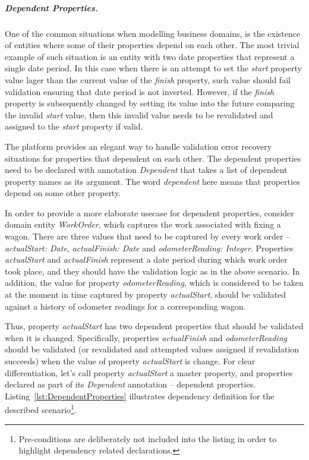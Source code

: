   \subparagraph*{Dependent Properties.}

  One of the common situations when modelling business domains, is the existence of entities where some of their properties depend on each other.
  The most trivial example of such situation is an entity with two date properties that represent a single date period.
  In this case when there is an attempt to set the \emph{start} property value lager than the current value of the \emph{finish} property, such value should fail validation ensuring that date period is not inverted.
  However, if the \emph{finish} property is subsequently changed by setting its value into the future comparing the invalid \emph{start} value, then this invalid value needs to be revalidated and assigned to the \emph{start} property if valid.
  
  The platform provides an elegant way to handle validation error recovery situations for properties that dependent on each other. 
  The dependent properties need to be declared with annotation \emph{Dependent} that takes a list of dependent property names as its argument. 
  The word \emph{dependent} here means that properties depend on some other property. 
  
  In order to provide a more elaborate usecase for dependent properties, consider domain entity \emph{WorkOrder}, which captures the work associated with fixing a wagon.
  There are three values that need to be captured by every work order -- \emph{actualStart: Date}, \emph{actualFinish: Date} and \emph{odometerReading: Integer}.
  Properties \emph{actualStart} and \emph{actualFinish} represent a date period during which work order took place, and they should have the validation logic as in the above scenario.
  In addition, the value for property \emph{odometerReading}, which is considered to be taken at the moment in time captured by property \emph{actualStart}, should be validated against a history of odometer readings for a corresponding wagon.

  Thus, property \emph{actualStart} has two dependent properties that should be validated when it is changed.
  Specifically, properties \emph{actualFinish} and \emph{odometerReading} should be validated (or revalidated and attempted values assigned if revalidation succeeds) when the value of property \emph{actualStart} is change.
  For clear differentiation, let's call property \emph{actualStart} a master property, and properties declared as part of its \emph{Dependent} annotation -- dependent properties.
  Listing~\ref{lst:DependentProperties} illustrates dependency definition for the described scenario\footnote{Pre-conditions are deliberately not included into the listing in order to highlight dependency related declarations.}.

